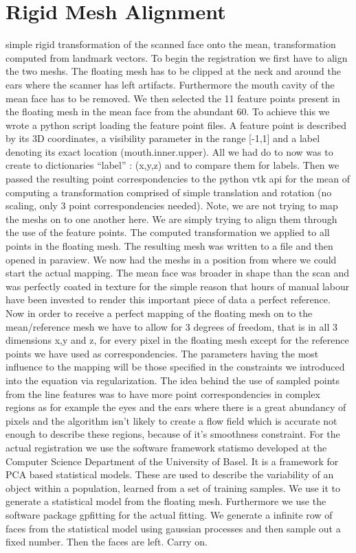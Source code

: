\section{Rigid Mesh Alignment}
simple rigid transformation of the scanned face onto the mean, transformation computed from landmark vectors.
To begin the registration we first have to align the two meshs. The floating mesh has to be clipped at the neck and around the ears where the scanner has left artifacts. Furthermore the mouth cavity of the mean face has to be removed. We then selected the 11 feature points present in the floating mesh in the mean face from the abundant 60. To achieve this we wrote a python script loading the feature point files. A feature point is described by its 3D coordinates, a visibility parameter
in the range [-1,1] and a label denoting its exact location (mouth.inner.upper). All we had do to now was to create to dictionaries “label” : (x,y,z) and to compare them for labels. Then we passed the resulting point correspondencies to the python vtk api for the mean of computing a transformation comprised of simple translation and rotation (no scaling, only 3 point correspondencies needed). Note, we are not trying to map the meshs on to one another here. We are simply trying to
align them through the use of the feature points. The computed transformation we applied to all points in the floating mesh. The resulting mesh was written to a file and then opened in paraview. We now had the meshs in a position from where we could start the actual mapping. The mean face was broader in shape than the scan and was perfectly coated in texture for the simple reason that hours of manual labour have been invested to render this important piece of data a perfect
reference.
Now in order to receive a perfect mapping of the floating mesh on to the mean/reference mesh we have to allow for 3 degrees of freedom, that is in all 3 dimensions x,y and z, for every pixel in the floating mesh except for the reference points we have used as correspondencies. The parameters having the most influence to the mapping will be those specified in the constraints we introduced into the equation via regularization. The idea behind the use of sampled points from
the line features was to have more point correspondencies in complex regions as for example the eyes and the ears where there is a great abundancy of pixels and the algorithm isn’t likely to create a flow field which is accurate not enough to describe these regions, because of it’s smoothness constraint.
For the actual registration we use the software framework statismo developed at the Computer Science Department of the University of Basel. It is a framework for PCA based statistical models. These are used to describe the variability of an object within a population, learned from a set of training samples. We use it to generate a statistical model from the floating mesh. Furthermore we use the software package gpfitting for the actual fitting. We generate a infinite row of
faces from the statistical model using gaussian processes and then sample out a fixed number. Then the faces are left. Carry on.

